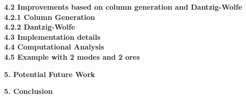 \documentclass[11pt]{article}
\begin{document}
\noindent \textbf{4.2 Improvements based on column generation and Dantzig-Wolfe}
\\

\noindent \textbf{4.2.1 Column Generation}
\\

\noindent \textbf{4.2.2 Dantzig-Wolfe}
\\

\noindent \textbf{4.3 Implementation details}
\\

\noindent \textbf{4.4 Computational Analysis}
\\

\noindent \textbf{4.5 Example with 2 modes and 2 ores}
\\

\newpage

\noindent \textbf{\large{5. Potential Future Work}}
\\

\newpage

\noindent \textbf{\large{5. Conclusion}}
\\
\end{document}
